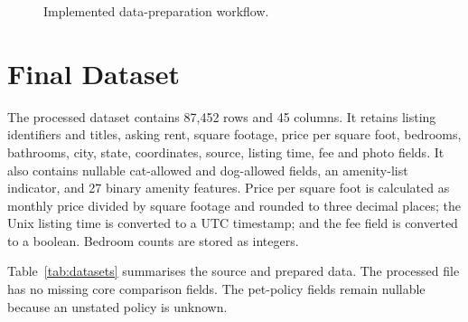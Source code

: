 \documentclass[12pt,a4paper]{report}
\begin{document}
\begin{figure}[htbp]
\centering
{}
\caption{Implemented data-preparation workflow.}
\label{fig:preprocessing}
\end{figure}

\section{Final Dataset}

The processed dataset contains 87,452 rows and 45 columns. It retains listing
identifiers and titles, asking rent, square footage, price per square foot,
bedrooms, bathrooms, city, state, coordinates, source, listing time, fee and
photo fields. It also contains nullable cat-allowed and dog-allowed fields,
an amenity-list indicator, and 27 binary amenity features. Price per square
foot is calculated as monthly price divided by square footage and rounded to
three decimal places; the Unix listing time is converted to a UTC timestamp;
and the fee field is converted to a boolean. Bedroom counts are stored as
integers.

Table~\ref{tab:datasets} summarises the source and prepared data. The
processed file has no missing core comparison fields. The pet-policy fields
remain nullable because an unstated policy is unknown.
\end{document}
